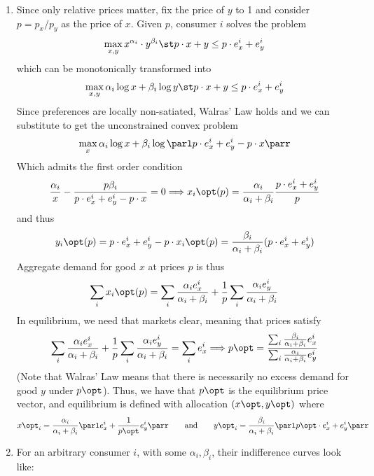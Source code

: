 \documentclass[10pt]{article}
\begin{document}
\begin{enumerate}
	\item Since only relative prices matter, fix the price of $y$ to 1 and consider $p = p_x/p_y$ as the price of $x$. Given $p$, consumer $i$ solves the problem \[\max_{x,y} x^{\alpha_i}\cdot y^{\beta_i} \st p \cdot x + y \le p \cdot e^i_x + e^i_y\]which can be monotonically transformed into\[\max_{x,y} \alpha_i \log x + \beta_i \log y \st p \cdot x + y \le p \cdot e^i_x + e^i_y\]Since preferences are locally non-satiated, Walras' Law holds and we can substitute to get the unconstrained convex problem \[\max_x \alpha_i \log x + \beta_i \log \parl p \cdot e^i_x + e^i_y - p \cdot x\parr \]Which admits the first order condition \[\frac{\alpha_i}{x} - \frac{p \beta_i}{ p \cdot e^i_x + e^i_y - p \cdot x} = 0 \Longrightarrow x_i\opt(p) = \frac{\alpha_i}{\alpha_i + \beta_i} \frac{p \cdot e_x^i + e^i_y}{p}\]and thus\[y_i\opt(p) =  p \cdot e^i_x + e^i_y - p \cdot x_i\opt(p) = \frac{\beta_i}{\alpha_i+\beta_i} (p \cdot e_x^i + e_y^i)\]Aggregate demand for good $x$ at prices $p$ is thus\[\sum_{i} x_i\opt(p) = \sum_i \frac{\alpha_i e_x^i}{\alpha_i+\beta_i} + \frac{1}{p}\sum_i \frac{\alpha_ie_y^i}{\alpha_i+\beta_i}\]In equilibrium, we need that markets clear, meaning that prices satisfy\[\sum_i \frac{\alpha_i e_x^i}{\alpha_i+\beta_i} + \frac{1}{p}\sum_i \frac{\alpha_ie_y^i}{\alpha_i+\beta_i} = \sum_i e_x^i \Longrightarrow p\opt = \frac{\sum_i \frac{\beta_i}{\alpha_i+\beta_i}e_x^i}{\sum_i \frac{\alpha_i}{\alpha_i+\beta_i}e_y^i}\](Note that Walras' Law means that there is necessarily no excess demand for good $y$ under $p\opt$). Thus, we have that $p\opt$ is the equilibrium price vector, and equilibrium is defined with allocation $(x\opt,y\opt)$ where\[x\opt_i = \frac{\alpha_i}{\alpha_i + \beta_i} \parl e_x^i + \frac{1}{p\opt} e_y^i\parr \qquad \text{and} \qquad y\opt_i = \frac{\beta_i}{\alpha_i+\beta_i} \parl p\opt \cdot e_x^i + e_y^i\parr\]
	\item For an arbitrary consumer $i$, with some $\alpha_i,\beta_i$, their indifference curves look like: 
	

\end{enumerate}
\end{document}
